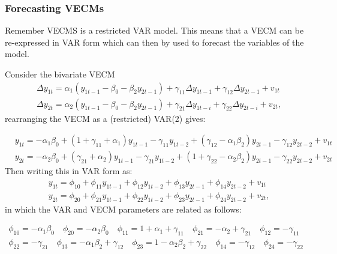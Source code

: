 \documentclass[11pt]{article}
\begin{document}
\subsubsection{Forecasting VECMs}
Remember VECMS is a restricted VAR model. This means that a VECM can be re-expressed in VAR form which can then by used to forecast the variables of the model.

Consider the bivariate VECM
\begin{equation}
\begin{aligned}
& \Delta y_{1 t}=\alpha_1\left(y_{1 t-1}-\beta_0-\beta_2 y_{2 t-1}\right)+\gamma_{11} \Delta y_{1 t-1}+\gamma_{12} \Delta y_{2 t-1}+v_{1 t} \\
& \Delta y_{2 t}=\alpha_2\left(y_{1 t-1}-\beta_0-\beta_2 y_{2 t-1}\right)+\gamma_{21} \Delta y_{1 t-i}+\gamma_{22} \Delta y_{2 t-i}+v_{2 t},
\end{aligned}
\end{equation}
rearranging the VECM as a (restricted) VAR(2) gives:

\begin{equation}
\begin{aligned}
& y_{1 t}=-\alpha_1 \beta_0+\left(1+\gamma_{11}+\alpha_1\right) y_{1 t-1}-\gamma_{11} y_{1 t-2}+\left(\gamma_{12}-\alpha_1 \beta_2\right) y_{2 t-1}-\gamma_{12} y_{2 t-2}+v_{1 t} \\
& y_{2 t}=-\alpha_2 \beta_0+\left(\gamma_{21}+\alpha_2\right) y_{1 t-1}-\gamma_{21} y_{1 t-2}+\left(1+\gamma_{22}-\alpha_2 \beta_2\right) y_{2 t-1}-\gamma_{22} y_{2 t-2}+v_{2 t}
\end{aligned}
\end{equation}
Then writing this in VAR form as:
\begin{equation}
\begin{aligned}
& y_{1 t}=\phi_{10}+\phi_{11} y_{1 t-1}+\phi_{12} y_{1 t-2}+\phi_{13} y_{2 t-1}+\phi_{14} y_{2 t-2}+v_{1 t} \\
& y_{2 t}=\phi_{20}+\phi_{21} y_{1 t-1}+\phi_{22} y_{1 t-2}+\phi_{23} y_{2 t-1}+\phi_{24} y_{2 t-2}+v_{2 t},
\end{aligned}
\end{equation}
in which the VAR and VECM parameters are related as follows:

\begin{gather*}
\phi_{10}=-\alpha_1 \beta_0 \quad \phi_{20}=-\alpha_2 \beta_0 \quad \phi_{11}=1+\alpha_1+\gamma_{11} \quad \phi_{21}=-\alpha_2+\gamma_{21} \quad \phi_{12}=-\gamma_{11} \\
\phi_{22}=-\gamma_{21} \quad \phi_{13}=-\alpha_1 \beta_2+\gamma_{12} \quad \phi_{23}=1-\alpha_2 \beta_2+\gamma_{22} \quad \phi_{14}=-\gamma_{12} \quad \phi_{24}=-\gamma_{22}
\end{gather*}
\end{document}
